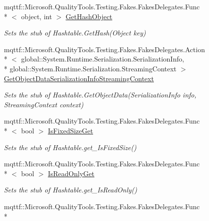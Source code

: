 \begin{DoxyCompactItemize}
mqttf\-::\-Microsoft.\-Quality\-Tools.\-Testing.\-Fakes.\-Fakes\-Delegates.\-Func\\*
$<$ object, int $>$ \hyperlink{class_system_1_1_configuration_1_1_fakes_1_1_stub_settings_attribute_dictionary_a7d2d9a2db8e6f809b6ea826cfb5b563f}{Get\-Hash\-Object}
\begin{DoxyCompactList}\small\item\em Sets the stub of Hashtable.\-Get\-Hash(\-Object key)\end{DoxyCompactList}\item 
mqttf\-::\-Microsoft.\-Quality\-Tools.\-Testing.\-Fakes.\-Fakes\-Delegates.\-Action\\*
$<$ global\-::\-System.\-Runtime.\-Serialization.\-Serialization\-Info, \\*
global\-::\-System.\-Runtime.\-Serialization.\-Streaming\-Context $>$ \hyperlink{class_system_1_1_configuration_1_1_fakes_1_1_stub_settings_attribute_dictionary_ad6437a2fb0a60bbd22b8e73495119326}{Get\-Object\-Data\-Serialization\-Info\-Streaming\-Context}
\begin{DoxyCompactList}\small\item\em Sets the stub of Hashtable.\-Get\-Object\-Data(\-Serialization\-Info info, Streaming\-Context context)\end{DoxyCompactList}\item 
mqttf\-::\-Microsoft.\-Quality\-Tools.\-Testing.\-Fakes.\-Fakes\-Delegates.\-Func\\*
$<$ bool $>$ \hyperlink{class_system_1_1_configuration_1_1_fakes_1_1_stub_settings_attribute_dictionary_a6b30a2ca8abba69db5dfb744d92f2ea1}{Is\-Fixed\-Size\-Get}
\begin{DoxyCompactList}\small\item\em Sets the stub of Hashtable.\-get\-\_\-\-Is\-Fixed\-Size()\end{DoxyCompactList}\item 
mqttf\-::\-Microsoft.\-Quality\-Tools.\-Testing.\-Fakes.\-Fakes\-Delegates.\-Func\\*
$<$ bool $>$ \hyperlink{class_system_1_1_configuration_1_1_fakes_1_1_stub_settings_attribute_dictionary_a0a3f6d7235ef0167044de808f9f2d52e}{Is\-Read\-Only\-Get}
\begin{DoxyCompactList}\small\item\em Sets the stub of Hashtable.\-get\-\_\-\-Is\-Read\-Only()\end{DoxyCompactList}\item 
mqttf\-::\-Microsoft.\-Quality\-Tools.\-Testing.\-Fakes.\-Fakes\-Delegates.\-Func\\*

\end{DoxyCompactItemize}
